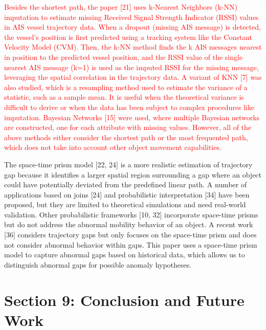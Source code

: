 \documentclass[twoside,leqno,onecolumn]{article}
\begin{document}
\textcolor{red}{Besides the shortest path, the paper [21] uses k-Nearest Neighbors (k-NN) imputation to estimate missing Received Signal Strength Indicator (RSSI) values in AIS vessel trajectory data. When a dropout (missing AIS message) is detected, the vessel's position is first predicted using a tracking system like the Constant Velocity Model (CVM). Then, the k-NN method finds the k AIS messages nearest in position to the predicted vessel position, and the RSSI value of the single nearest AIS message (k=1) is used as the imputed RSSI for the missing message, leveraging the spatial correlation in the trajectory data. A variant of KNN [7] was also studied, which is a resampling method used to estimate the variance of a statistic, such as a sample mean. It is useful when the theoretical variance is difficult to derive or when the data has been subject to complex procedures like imputation. Bayesian Networks [15] were used, where multiple Bayesian networks are constructed, one for each attribute with missing values. However, all of the above methods either consider the shortest path or the most frequented path, which does not take into account other object movement capabilities.}

The space-time prism model [22, 24] is a more realistic estimation of trajectory gap because it identifies a larger spatial region surrounding a gap where an object could have potentially deviated from the predefined linear path. A number of applications based on joins [24] and probabilistic interpretation [34] have been proposed, but they are limited to theoretical simulations and need real-world validation. Other probabilistic frameworks [10, 32] incorporate space-time prisms but do not address the abnormal mobility behavior of an object. A recent work [36] considers trajectory gaps but only focuses on the space-time prism and does not consider abnormal behavior within gaps. This paper uses a space-time prism model to capture abnormal gaps based on historical data, which allows us to distinguish abnormal gaps for possible anomaly hypotheses.

\section{Section 9: Conclusion and Future Work}
\end{document}
